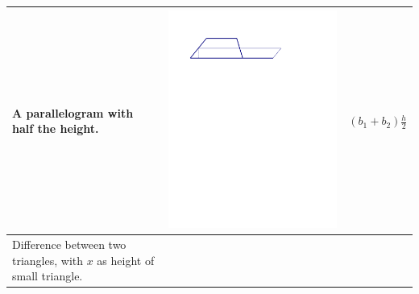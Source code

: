 \documentclass{ximera}
\begin{document}
{\begin{tabular}{|>{\centering\arraybackslash}m{2.5cm}|>{\centering\arraybackslash}m{9.5cm}|c|}
A parallelogram with half the height. & \includegraphics[scale=0.7]{./graphics/trapezoid5.pdf} & $(b_1+b_2)\frac{h}{2}$ \\ \hline
Difference between two triangles, with $x$ as height of small triangle. 

\end{tabular}}
\end{document}
